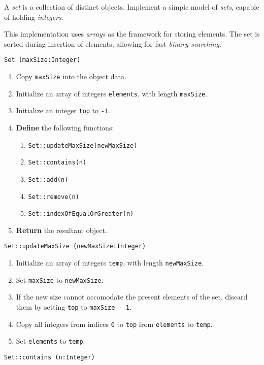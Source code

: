 

\problem A \textit{set} is a collection of distinct objects. Implement a simple model of \textit{sets}, capable
of holding \textit{integers}. 

\solution This implementation uses \textit{arrays} as the framework for storing elements. The set is sorted during
insertion of elements, allowing for fast \textit{binary searching}.

\algorithm
\texttt{Set (maxSize:Integer)}
\begin{enumerate}
	\item Copy \texttt{maxSize} into the object data.
	\item Initialize an array of integers \texttt{elements}, with length \texttt{maxSize}.
	\item Initialize an integer \texttt{top} to \texttt{-1}. 
	\item \textbf{Define} the following functions:
	\begin{enumerate}
		\item \texttt{Set::updateMaxSize(newMaxSize)}
		\item \texttt{Set::contains(n)}
		\item \texttt{Set::add(n)} 
		\item \texttt{Set::remove(n)}
		\item \texttt{Set::indexOfEqualOrGreater(n)}
	\end{enumerate}
	\item \textbf{Return} the resultant object. 
\end{enumerate}
\vspace{5mm}
\texttt{Set::updateMaxSize (newMaxSize:Integer)} 
\begin{enumerate}
	\item Initialize an array of integers \texttt{temp}, with length \texttt{newMaxSize}.
	\item Set \texttt{maxSize} to \texttt{newMaxSize}.
	\item If the new size cannot accomodate the present elements of the set, discard them by setting \texttt{top}
		to \texttt{maxSize - 1}.
	\item Copy all integers from indices \texttt{0} to \texttt{top} from \texttt{elements} to \texttt{temp}. 
	\item Set \texttt{elements} to \texttt{temp}.
\end{enumerate}
\vspace{5mm}
\texttt{Set::contains (n:Integer)} 
